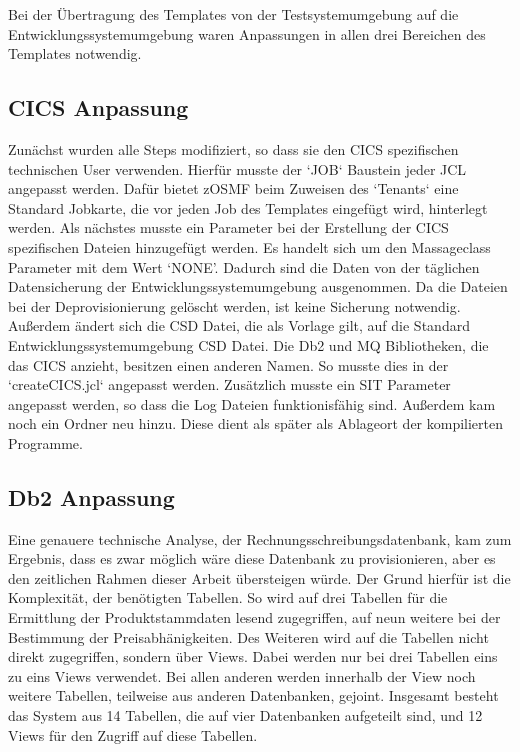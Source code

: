 Bei der Übertragung des Templates von der Testsystemumgebung auf die Entwicklungssystemumgebung waren Anpassungen in allen drei Bereichen des Templates notwendig.

\subsection{CICS Anpassung}
Zunächst wurden alle Steps modifiziert, so dass sie den CICS spezifischen technischen User verwenden.
Hierfür musste der `JOB` Baustein jeder JCL angepasst werden.
Dafür bietet zOSMF beim Zuweisen des `Tenants` eine Standard Jobkarte, die vor jeden Job des Templates eingefügt wird, hinterlegt werden.
Als nächstes musste ein Parameter bei der Erstellung der CICS spezifischen Dateien hinzugefügt werden.
Es handelt sich um den Massageclass Parameter mit dem Wert `NONE'.
Dadurch sind die Daten von der täglichen Datensicherung der Entwicklungssystemumgebung ausgenommen.
Da die Dateien bei der Deprovisionierung gelöscht werden, ist keine Sicherung notwendig.
Außerdem ändert sich die CSD Datei, die als Vorlage gilt, auf die Standard Entwicklungssystemumgebung CSD Datei.
Die Db2 und MQ Bibliotheken, die das CICS anzieht, besitzen einen anderen Namen.
So musste dies in der `createCICS.jcl` angepasst werden.
Zusätzlich musste ein SIT Parameter angepasst werden, so dass die Log Dateien funktionisfähig sind.
Außerdem kam noch ein Ordner neu hinzu.
Diese dient als später als Ablageort der kompilierten Programme.

\subsection{Db2 Anpassung}\label{ssec:db2entw}
Eine genauere technische Analyse, der Rechnungsschreibungsdatenbank, kam zum Ergebnis, dass es zwar möglich wäre diese Datenbank zu provisionieren, aber es den zeitlichen Rahmen dieser Arbeit übersteigen würde.
Der Grund hierfür ist die Komplexität, der benötigten Tabellen.
So wird auf drei Tabellen für die Ermittlung der Produktstammdaten lesend zugegriffen, auf neun weitere bei der Bestimmung der Preisabhänigkeiten.
Des Weiteren wird auf die Tabellen nicht direkt zugegriffen, sondern über Views.
Dabei werden nur bei drei Tabellen eins zu eins Views verwendet.
Bei allen anderen werden innerhalb der View noch weitere Tabellen, teilweise aus anderen Datenbanken, gejoint.
Insgesamt besteht das System aus 14 Tabellen, die auf vier Datenbanken aufgeteilt sind, und 12 Views für den Zugriff auf diese Tabellen.

